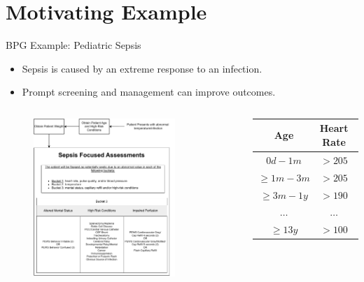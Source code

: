 \documentclass{beamer}
\begin{document}
\section{Motivating Example}
\begin{frame}{BPG Example: Pediatric Sepsis}
  \begin{itemize}
    \item Sepsis is caused by an extreme response to an infection.
    \item Prompt screening and management can improve outcomes.
  \end{itemize}
  \pause
  \begin{columns}
    \begin{figure}
      \includegraphics[width=0.8\textwidth]{sepsis-screening-osf}
    \end{figure}
    \tiny
    \begin{tabular}{ | c || c | c | }
      \hline
      \textbf{Age}            & \textbf{Heart Rate}    & \textbf{Temp}  \\
      \hline
      $0d - 1m$               & $>205$                 & $<36 \text{ or } >38$ \\
      \hline
      $\geq 1m - 3m$          & $>205$                 & $<36 \text{ or } >38$ \\
      \hline
      $\geq 3m - 1y$          & $>190$                 & $<36 \text{ or } >38.5$ \\
      \hline
      $\dots$                 & $\dots$                & $\dots$ \\
      \hline
      $\geq 13y$              & $>100$                 & $<36 \text{ or } >38.5$ \\
      \hline
    \end{tabular}
  \end{columns}
\end{frame}
\end{document}
